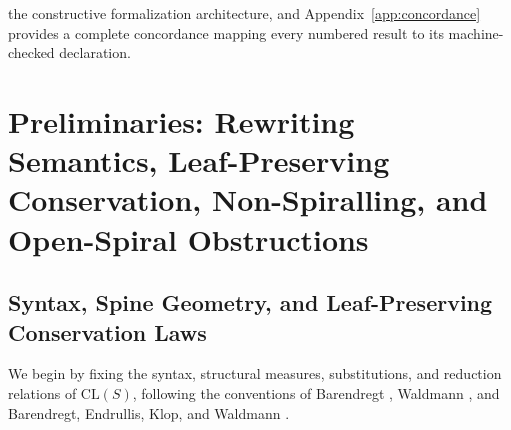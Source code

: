 \documentclass[11pt,reqno]{amsart}
\numberwithin{equation}{section}
\theoremstyle{plain}
\theoremstyle{definition}
\theoremstyle{remark}
\newcommand{\CLS}{\mathrm{CL}(S)}
\begin{document}
the constructive formalization architecture, and Appendix~\ref{app:concordance} provides a complete concordance mapping every numbered result to its machine-checked declaration.

\section{Preliminaries: Rewriting Semantics, Leaf-Preserving Conservation, Non-Spiralling, and Open-Spiral Obstructions}\label{sec:prelim}

\subsection{Syntax, Spine Geometry, and Leaf-Preserving Conservation Laws}\label{subsec:prelim-syntax}

We begin by fixing the syntax, structural measures, substitutions, and reduction relations of $\CLS$, following the conventions of Barendregt \cite{Barendregt1984}, Waldmann \cite{Waldmann2000}, and Barendregt, Endrullis, Klop, and Waldmann \cite{BarendregtEndrullisKlopWaldmann2017}.
\end{document}
